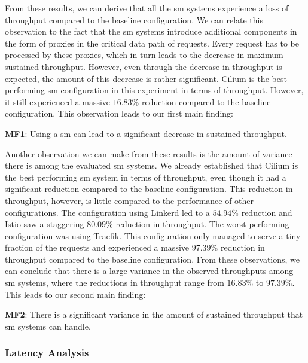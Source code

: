 From these results, we can derive that all the \gls{sm} systems experience a loss of throughput compared to the baseline configuration. We can relate this observation to the fact that the \gls{sm} systems introduce additional components in the form of proxies in the critical data path of requests. Every request has to be processed by these proxies, which in turn leads to the decrease in maximum sustained throughput. However, even through the decrease in throughput is expected, the amount of this decrease is rather significant. Cilium is the best performing \gls{sm} configuration in this experiment in terms of throughput. However, it still experienced a massive $16.83\%$ reduction compared to the baseline configuration. This observation leads to our first main finding: 

\begin{shaded*}
    \noindent
    \textbf{MF1}: 
    Using a \gls{sm} can lead to a significant decrease in sustained throughput.
\end{shaded*}

Another observation we can make from these results is the amount of variance there is among the evaluated \gls{sm} systems. We already established that Cilium is the best performing \gls{sm} system in terms of throughput, even though it had a significant reduction compared to the baseline configuration. This reduction in throughput, however, is little compared to the performance of other configurations. The configuration using Linkerd led to a $54.94\%$ reduction and Istio saw a staggering $80.09\%$ reduction in throughput. The worst performing configuration was using Traefik. This configuration only managed to serve a tiny fraction of the requests and experienced a massive $97.39\%$ reduction in throughput compared to the baseline configuration. From these observations, we can conclude that there is a large variance in the observed throughputs among \gls{sm} systems, where the reductions in throughput range from $16.83\%$ to $97.39\%$. This leads to our second main finding:

\begin{shaded*}
    \noindent
    \textbf{MF2}: 
    There is a significant variance in the amount of sustained throughput that \gls{sm} systems can handle.
\end{shaded*}

\subsubsection{Latency Analysis}
\label{sec:experiments:results:per-experiment:01:latency}

